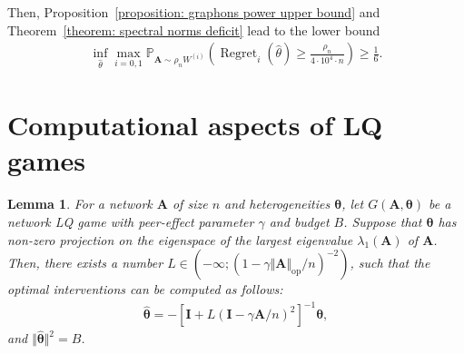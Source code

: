 \documentclass[11pt]{article}
\newcommand{\op}{\mathrm{op}}
\newcommand{\bA}{\bm{A}}
\newcommand{\btheta}{\bm{\theta}}
\newcommand{\bI}{\bm{I}}
\newcommand{\bbP}{\mathbb{P}}
\newcommand{\<}{\langle}
\renewcommand{\>}{\rangle}
\newcommand{\regret}{\operatorname{Regret}}
\theoremstyle{plain}
\newtheorem{lemma}{Lemma}
\theoremstyle{definition}
\theoremstyle{remark}
\begin{document}
{   Then, Proposition~\ref{proposition: graphons power upper bound} and Theorem~\ref{theorem: spectral norms deficit} lead to the lower bound
   \begin{align*}
     \inf_{\widehat{\theta}} \max_{i = 0, 1} \bbP_{\bA \sim \rho_n W^{(i)}} \left ( \regret_i(\widehat{\theta}) \ge \frac{\rho_n}{4 \cdot 10^4 \cdot n} \right ) \ge \frac{1}{6}.
   \end{align*}

   






 
\section{Computational aspects of LQ games}
\label{section: computational aspects}

\begin{lemma}
\label{lemma: computational aspects}
For a network $\bA$ of size $n$ and heterogeneities $\btheta$, let $G(\bA, \btheta)$ be a network LQ game with peer-effect parameter $\gamma$ and budget $B$. Suppose that $\btheta$ has non-zero projection on the eigenspace of the largest eigenvalue $\lambda_1(\bA)$ of $\bA$. Then, there exists a number $L \in \left (-\infty; (1 - \gamma \Vert \bA \Vert_{\op} / n)^{-2} \right )$, such that the optimal interventions can be computed as follows:
\begin{align*}
    \widehat{\btheta} = - \left [\bI + L (\bI - \gamma \bA / n)^2 \right ]^{-1} \btheta, 
\end{align*}
and $\Vert \widehat{\btheta} \Vert^2 = B$.
\end{lemma}

}
\end{document}
